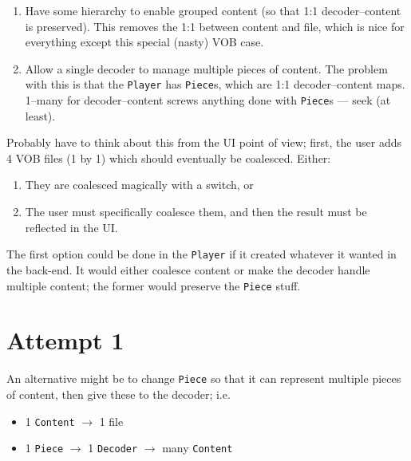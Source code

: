 \documentclass{article}
\begin{document}
\begin{enumerate}
\item Have some hierarchy to enable grouped content (so that 1:1
  decoder--content is preserved).  This removes the 1:1 between
  content and file, which is nice for everything except this
  special (nasty) VOB case.
\item Allow a single decoder to manage multiple pieces of content.
  The problem with this is that the \texttt{Player} has
  \texttt{Piece}s, which are 1:1 decoder--content maps.  1--many for
  decoder--content screws anything done with \texttt{Piece}s --- seek
  (at least).
\end{enumerate}

Probably have to think about this from the UI point of view; first,
the user adds 4 VOB files (1 by 1) which should eventually be
coalesced.  Either:

\begin{enumerate}
\item They are coalesced magically with a switch, or
\item The user must specifically coalesce them, and then the result
  must be reflected in the UI.
\end{enumerate}

The first option could be done in the \texttt{Player} if it created
whatever it wanted in the back-end.  It would either coalesce content
or make the decoder handle multiple content; the former would preserve
the \texttt{Piece} stuff.

\section{Attempt 1}

An alternative might be to change \texttt{Piece} so that it can
represent multiple pieces of content, then give these to the decoder; i.e.

\begin{itemize}
\item 1 \texttt{Content} $\to$ 1 file
\item 1 \texttt{Piece} $\to$ 1 \texttt{Decoder} $\to$ many \texttt{Content}
\end{itemize}
\end{document}
